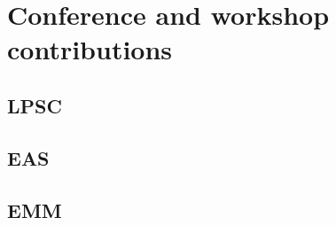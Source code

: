 
\section{Conference and workshop contributions}

\subsection{LPSC}

\subsection{EAS}

\subsection{EMM}